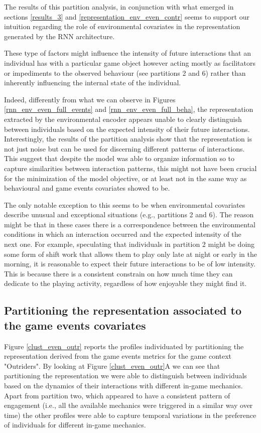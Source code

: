 The results of this partition analysis, in conjunction with what emerged in sections \ref{results_3} and \ref{representation_env_even_contr} seems to support our intuition regarding the role of environmental covariates in the representation generated by the RNN architecture. 

These type of factors might influence the intensity of future interactions that an individual has with a particular game object however acting mostly as facilitators or impediments to the observed behaviour (see partitions 2 and 6) rather than inherently influencing the internal state of the individual. 

Indeed, differently from what we can observe in Figures \ref{rnn_env_even_full_events} and \ref{rnn_env_even_full_beha}, the representation extracted by the environmental encoder appears unable to clearly distinguish between individuals based on the expected intensity of their future interactions. Interestingly, the results of the partition analysis show that the representation is not just noise but can be used for discerning different patterns of interactions. This suggest that despite the model was able to organize information so to capture similarities between interaction patterns, this might not have been crucial for the minimization of the model objective, or at least not in the same way as behavioural and game events covariates showed to be.

The only notable exception to this seems to be when environmental covariates describe unusual and exceptional situations (e.g., partitions 2 and 6). The reason might be that in these cases there is a correspondence between the environmental conditions in which an interaction occurred and the expected intensity of the next one. For example, speculating that individuals in partition 2 might be doing some form of shift work that allows them to play only late at night or early in the morning, it is reasonable to expect their future interactions to be of low intensity. This is because there is a consistent constrain on how much time they can dedicate to the playing activity, regardless of how enjoyable they might find it.

\subsection{Partitioning the representation associated to the game events covariates}
Figure \ref{clust_even_outr} reports the profiles individuated by partitioning the representation derived from the game events metrics for the game context "Outriders". By looking at Figure \ref{clust_even_outr}A we can see that partitioning the representation we  were able to distinguish between individuals based on the dynamics of their interactions with different in-game mechanics. Apart from partition two, which appeared to have a consistent pattern of engagement (i.e., all the available mechanics were triggered in a similar way over time) the other profiles were able to capture temporal variations in the preference of individuals for different in-game mechanics.

